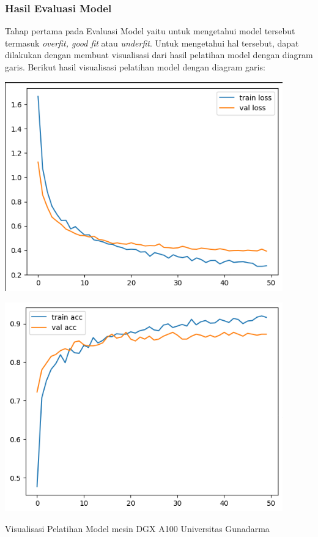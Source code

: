 \subsubsection{Hasil Evaluasi Model}
Tahap pertama pada Evaluasi Model yaitu untuk mengetahui model tersebut termasuk \textit{overfit, good fit} atau \textit{underfit}. Untuk mengetahui hal tersebut, dapat dilakukan dengan membuat visualisasi dari hasil pelatihan model dengan diagram garis. Berikut hasil visualisasi pelatihan model dengan diagram garis:

\begin{afigure}
    \includegraphics[height=0.4\textheight, width=0.9\textwidth, center]{images/train-loss-dgx.png}
    \label{fig:train-loss-dgx}
\end{afigure}
\pagebreak
\begin{afigure}
    \includegraphics[height=0.4\textheight, width=0.9\textwidth, center]{images/train-acc-dgx.png}
    \caption{Visualisasi Pelatihan Model mesin DGX A100 Universitas Gunadarma}
    \label{fig:train-acc-dgx}
\end{afigure}

